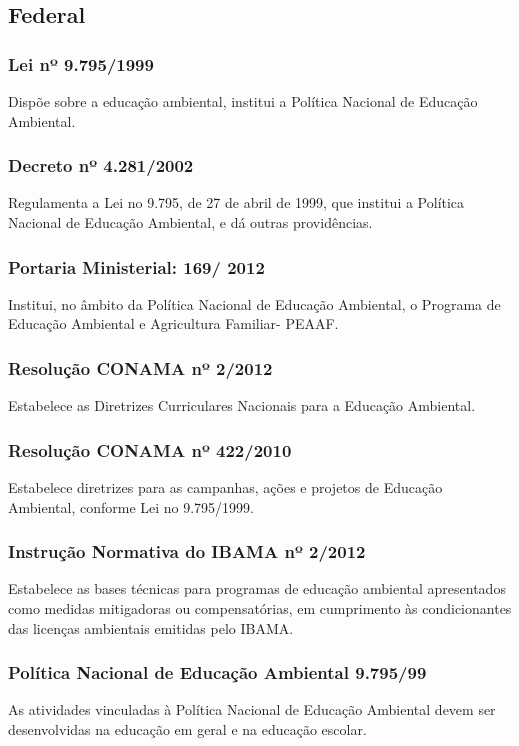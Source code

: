 \begin{subapend}
	\subsection{Federal}
	\begin{subsubapend}
		\item \subsubsection{Lei nº 9.795/1999}
		Dispõe sobre a educação ambiental, institui a Política Nacional de Educação Ambiental.
		\subsubsection{Decreto nº 4.281/2002}
		Regulamenta a Lei no 9.795, de 27 de abril de 1999, que institui a Política Nacional de Educação Ambiental, e dá outras providências.
		\subsubsection{Portaria Ministerial: 169/ 2012}
		Institui, no âmbito da Política Nacional de Educação Ambiental, o Programa de Educação Ambiental e Agricultura Familiar- PEAAF.
		\subsubsection{Resolução CONAMA nº 2/2012}
		Estabelece as Diretrizes Curriculares Nacionais para a Educação Ambiental.
		\subsubsection{Resolução CONAMA nº 422/2010}
		Estabelece diretrizes para as campanhas, ações e projetos de Educação Ambiental, conforme Lei no 9.795/1999.
		\subsubsection{Instrução Normativa do IBAMA nº 2/2012}
		Estabelece as bases técnicas para programas de educação ambiental apresentados como medidas mitigadoras ou compensatórias, em cumprimento às condicionantes das licenças ambientais emitidas pelo IBAMA.
		\subsubsection{Política Nacional de Educação Ambiental 9.795/99}
		As atividades vinculadas à Política Nacional de Educação Ambiental devem ser desenvolvidas na educação em geral e na educação escolar.

\end{subsubapend}
\end{subapend}
